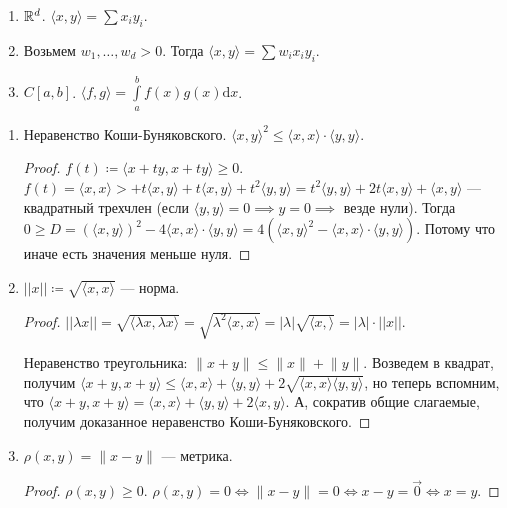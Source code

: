 \begin{example}
    \begin{enumerate}
        \item $\mathbb{R}^d$.  $\langle x, y\rangle = \sum x_iy_i$.
        \item Возьмем $w_1, \ldots, w_d > 0$. Тогда $\langle x, y \rangle = \sum w_i x_i y_i$.
        \item $C[a, b]$.  $\langle f, g \rangle = \int\limits_a^b f(x)g(x) \mathrm{d}x$.
    \end{enumerate}
\end{example}
\begin{properties}
    \begin{enumerate}
        \item Неравенство Коши-Буняковского. $\langle x, y \rangle^2 \le \langle x, x \rangle \cdot \langle y, y\rangle$.
            \begin{proof}
                $f(t) \coloneqq \langle x+ty, x +ty \rangle \ge 0$. $f(t) = \langle x, x \rangle> + t\langle x, y \rangle + t\langle x, y \rangle + t^2 \langle y, y \rangle = t^2 \langle y, y\rangle + 2t\langle x, y \rangle + \langle x, y \rangle$ --- квадратный трехчлен (если $\langle y, y \rangle = 0 \implies y = 0 \implies$ везде нули). Тогда $0 \ge D= (\langle x, y \rangle)^2 - 4 \langle x, x\rangle \cdot \langle y, y \rangle = 4(\langle x, y \rangle^2 - \langle x, x\rangle \cdot \langle y, y \rangle)$. Потому что иначе есть значения меньше нуля.
            \end{proof}
        \item $||x|| \coloneqq \sqrt{\langle x, x \rangle}$ --- норма.
             \begin{proof}
                $||\lambda x|| = \sqrt{\langle \lambda x, \lambda x\rangle} = \sqrt{\lambda^2\langle x, x \rangle} = |\lambda| \sqrt{\langle x, \rangle} = |\lambda| \cdot ||x||$.

                Неравенство треугольника: $\lVert x+y \rVert \le \lVert x \rVert + \lVert y \rVert$.
                Возведем в квадрат, получим $\langle x + y, x + y\rangle \le \langle x, x\rangle + \langle y, y\rangle + 2\sqrt{\langle x, x\rangle\langle y, y\rangle}$, но теперь вспомним, что $\langle x + y, x + y\rangle = \langle x, x\rangle + \langle y, y\rangle + 2\langle x, y\rangle$.
                А, сократив общие слагаемые, получим доказанное неравенство Коши-Буняковского.
            \end{proof}
        \item $\rho(x, y) = \lVert x - y \rVert$ --- метрика.
            \begin{proof}
                $\rho(x, y) \ge 0$. $\rho(x, y) = 0 \iff \lVert x - y \rVert = 0 \iff x - y = \overrightarrow{0} \iff x = y$.


\end{proof}
\end{enumerate}
\end{properties}

